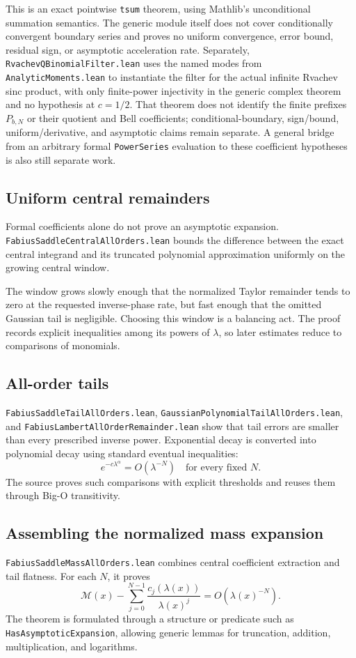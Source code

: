 \documentclass[11pt,oneside]{article}
\theoremstyle{definition}
\theoremstyle{remark}
\begin{document}
This is an exact pointwise \nolinkurl{tsum} theorem, using Mathlib's
unconditional summation semantics.  The generic module itself does not cover
conditionally convergent boundary series and proves no uniform convergence,
error bound, residual sign, or asymptotic acceleration rate.  Separately,
\nolinkurl{RvachevQBinomialFilter.lean} uses the named modes from
\nolinkurl{AnalyticMoments.lean} to instantiate the filter for the actual
infinite Rvachev sinc product, with only finite-power injectivity in the
generic complex theorem and no hypothesis at \(c=1/2\).  That theorem does
not identify the finite prefixes \(P_{b,N}\) or their quotient and Bell
coefficients; conditional-boundary, sign/bound, uniform/derivative, and
asymptotic claims remain separate.  A general bridge from an arbitrary formal
\nolinkurl{PowerSeries} evaluation to these coefficient hypotheses is also
still separate work.

\subsection{Uniform central remainders}
Formal coefficients alone do not prove an asymptotic expansion.  \nolinkurl{FabiusSaddleCentralAllOrders.lean} bounds the difference between the exact central integrand and its truncated polynomial approximation uniformly on the growing central window.

The window grows slowly enough that the normalized Taylor remainder tends to zero at the requested inverse-phase rate, but fast enough that the omitted Gaussian tail is negligible.  Choosing this window is a balancing act.  The proof records explicit inequalities among its powers of \(\lambda\), so later estimates reduce to comparisons of monomials.

\subsection{All-order tails}
\nolinkurl{FabiusSaddleTailAllOrders.lean}, \nolinkurl{GaussianPolynomialTailAllOrders.lean}, and \nolinkurl{FabiusLambertAllOrderRemainder.lean} show that tail errors are smaller than every prescribed inverse power.  Exponential decay is converted into polynomial decay using standard eventual inequalities:
\[
  e^{-c\lambda^\alpha}=O(\lambda^{-N})
  \quad\text{for every fixed }N.
\]
The source proves such comparisons with explicit thresholds and reuses them through Big-O transitivity.

\subsection{Assembling the normalized mass expansion}
\nolinkurl{FabiusSaddleMassAllOrders.lean} combines central coefficient extraction and tail flatness.  For each \(N\), it proves
\[
  \mathcal M(x)-\sum_{j=0}^{N-1}\frac{c_j(\lambda(x))}{\lambda(x)^j}
  =O(\lambda(x)^{-N}).
\]
The theorem is formulated through a structure or predicate such as \nolinkurl{HasAsymptoticExpansion}, allowing generic lemmas for truncation, addition, multiplication, and logarithms.
\end{document}
